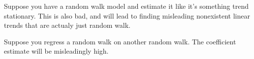 \documentclass[12pt]{article}
\theoremstyle{plain}
\theoremstyle{definition}
\theoremstyle{remark}
\newcommand{\Var}{\operatorname{Var}}
\begin{document}
Suppose you have a random walk model and estimate it like it's something
trend stationary. This is also bad, and will lead to finding misleading
nonexistent linear trends that are actualy just random walk.

Suppose you regress a random walk on another random walk. The
coefficient estimate will be misleadingly high.








\end{document}
